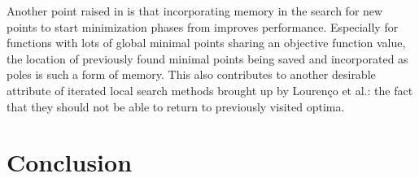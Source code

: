 \documentclass[a4paper,12pt,twoside]{article}
\begin{document}
Another point raised in \cite{lourenco_iterated_2003} is that incorporating memory in the search for new points to start minimization phases from improves performance. Especially for functions with lots of global minimal points sharing an objective function value, the location of previously found minimal points being saved and incorporated as poles is such a form of memory. This also contributes to another desirable attribute of iterated local search methods brought up by Lourenço et al.: the fact that they should not be able to return to previously visited optima. 

\section{Conclusion}



\printbibliography
\end{document}

